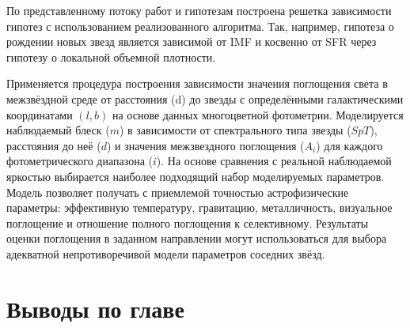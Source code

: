 По представленному потоку работ и гипотезам построена решетка зависимости гипотез с использованием реализованного 
алгоритма. Так, например, гипотеза о рождении новых звезд является зависимой от IMF и косвенно 
от SFR через гипотезу о локальной объемной плотности.

Применяется процедура построения зависимости значения поглощения света в межзвёздной среде от расстояния 
(d) до звезды с определёнными галактическими координатами $(l, b)$ на основе данных многоцветной фотометрии. 
Моделируется наблюдаемый блеск ($m$) в зависимости от спектрального типа звезды ($SpT$), расстояния до неё ($d$) 
и значения межзвездного поглощения ($A_i$) для каждого фотометрического диапазона ($i$). На основе сравнения с 
реальной наблюдаемой яркостью выбирается наиболее подходящий набор моделируемых параметров. Модель позволяет 
получать с приемлемой точностью астрофизические параметры: эффективную температуру, гравитацию, металличность, 
визуальное поглощение и отношение полного поглощения к селективному. Результаты оценки поглощения в заданном 
направлении могут использоваться для выбора адекватной непротиворечивой модели параметров соседних звёзд.


\section{Выводы по главе}\label{sect2_6}



\FloatBarrier
